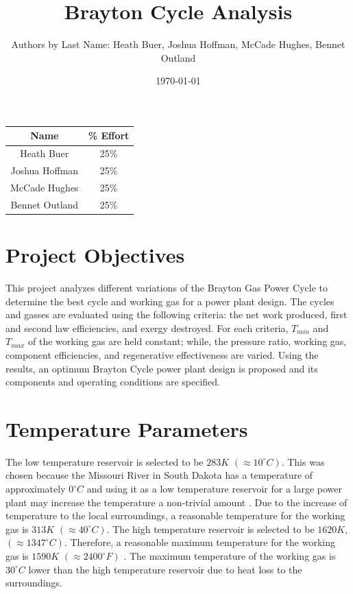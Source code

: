 \documentclass[
	12pt, %
]{brayton_cycle_report_style}
\title{Brayton Cycle Analysis}        %
\author{Authors by Last Name: Heath Buer, Joshua Hoffman, McCade Hughes, Bennet Outland}   %
\date{\today}        %
\institute{Department of Mechanical Engineering}              %
\begin{document}
\maketitle 
\begin{table}
    \centering
    \begin{tabular}{c|c}
        Name & \% Effort \\
        \hline
        Heath Buer & 25\% \\
        Joshua Hoffman & 25\% \\
        McCade Hughes & 25\% \\
        Bennet Outland & 25\%
    \end{tabular}
\end{table}





\newpage
{}
\tableofcontents
\newpage
{}          %

\section{Project Objectives}
This project analyzes different variations of the Brayton Gas Power Cycle to determine the best cycle and working gas for a power plant design. The cycles and gasses are evaluated using the following criteria: the net work produced, first and second law efficiencies, and exergy destroyed. For each criteria, $T_{min}$ and $T_{max}$ of the working gas are held constant; while, the pressure ratio, working gas, component efficiencies, and regenerative effectiveness are varied. Using the results, an optimum Brayton Cycle power plant design is proposed and its components and operating conditions are specified. 

\section{Temperature Parameters}
The low temperature reservoir is selected to be $283K$ $(\approx 10^{\circ} C)$. This was chosen because the Missouri River in South Dakota has a temperature of approximately $0^{\circ} C$ and using it as a low temperature reservoir for a large power plant may increase the temperature a non-trivial amount \cite{commerce_2022}. Due to the increase of temperature to the local surroundings, a reasonable temperature for the working gas is $313K$ $(\approx 40^{\circ} C)$. The high temperature reservoir is selected to be $1620K$, $(\approx 1347^{\circ} C)$. Therefore, a reasonable maximum temperature for the working gas is $1590K$ $(\approx 2400^{\circ} F)$ \cite{general_electric}. The maximum temperature of the working gas is $30^{\circ} C$ lower than the high temperature reservoir due to heat loss to the surroundings.
\end{document}
